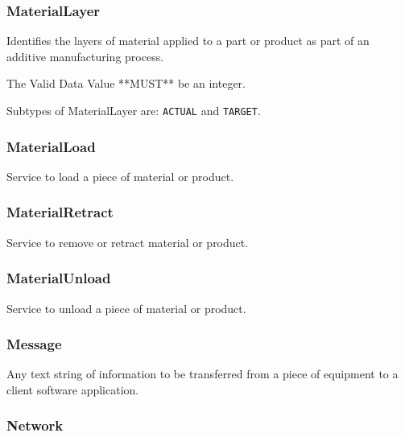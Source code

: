 \FloatBarrier

\subsubsection{MaterialLayer}
  \label{sec:MaterialLayer}


Identifies the layers of material applied to a part or product as part of an additive manufacturing process.
  
 The \gls{Valid Data Value} **MUST** be an integer.


Subtypes of MaterialLayer are: \texttt{ACTUAL} and \texttt{TARGET}. 
\FloatBarrier

\subsubsection{MaterialLoad}
  \label{sec:MaterialLoad}


Service to load a piece of material or product.

\FloatBarrier

\subsubsection{MaterialRetract}
  \label{sec:MaterialRetract}


Service to remove or retract material or product.

\FloatBarrier

\subsubsection{MaterialUnload}
  \label{sec:MaterialUnload}


Service to unload a piece of material or product.

\FloatBarrier

\subsubsection{Message}
  \label{sec:Message}


Any text string of information to be transferred from a piece of equipment to a client software application.

\FloatBarrier

\subsubsection{Network}
  \label{sec:Network}


